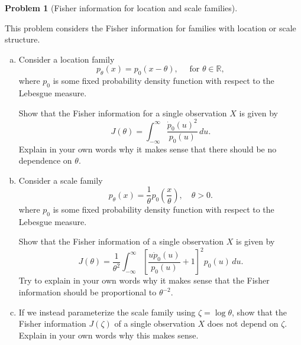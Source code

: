 \documentclass{article}
\newcommand{\RR}{\mathbb{R}}
\theoremstyle{definition}
\newtheorem{problem}{Problem}
\begin{document}
\begin{problem}[Fisher information for location and scale families]
\label{prob:fisher-location-scale}

This problem considers the Fisher information for families with location or scale structure.

\begin{enumerate}[(a)]

\item Consider a location family
\[
p_\theta(x) = p_0(x-\theta), \quad \text{ for } \theta \in \RR,
\]
where $p_0$ is some fixed probability density function with respect to the Lebesgue measure.

Show that the Fisher information for a single observation $X$ is given by
\[
J(\theta) = \int_{-\infty}^\infty \frac{\dot{p}_0(u)^2}{p_0(u)}\,d u.
\]
Explain in your own words why it makes sense that there should be no dependence on $\theta$.



\item Consider a scale family 
\[p_\theta(x) = \frac{1}{\theta}p_0\left(\frac{x}{\theta}\right),\quad \theta > 0.\]
where $p_0$ is some fixed probability density function with respect to the Lebesgue measure.

Show that the Fisher information of a single observation $X$ is given by
\[J(\theta) = \frac{1}{\theta^{2}}\int_{-\infty}^\infty\left[\frac{u \dot{p}_0(u)}{p_0(u)} + 1\right]^{2}p_0(u)\,d u.\]
Try to explain in your own words why it makes sense that the Fisher information should be proportional to $\theta^{-2}$.



\item If we instead parameterize the scale family using $\zeta = \log\theta$, show that the Fisher information $J(\zeta)$ of a single observation $X$ does not depend on $\zeta$. Explain in your own words why this makes sense.



\end{enumerate}
\end{problem}





\end{document}
